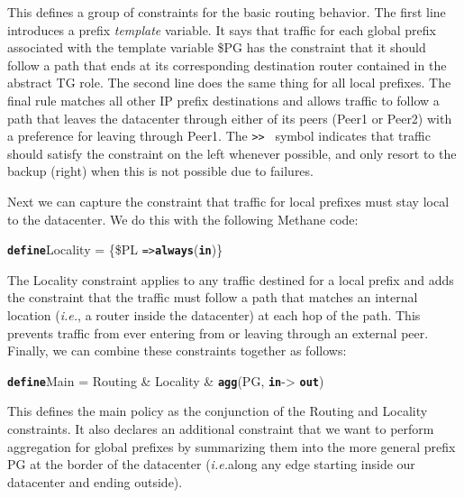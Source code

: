 \documentclass{sig-alternate-10pt}
\newcommand{\IE}{\emph{i.e.}}
\newcommand{\sysname}{{\small \sf Methane}\xspace}
\newcommand{\CD}[1]{\texttt{\small #1}}  %
\newcommand{\KW}[1]{\texttt{\small\bfseries{#1}}}
\newcommand{\True}{\CD{true}}
\newcommand{\Define}{\KW{define}}
\newcommand{\Prefer}{\texttt{>>}}
\newcommand{\Path}{\texttt{=>}}
\newcommand{\Agg}{\KW{agg}}
\newcommand{\In}{\KW{in}}
\newcommand{\Out}{\KW{out}}
\newcommand{\Always}{\KW{always}}
\newcommand{\Novalley}{\KW{novalley}}
\begin{document}
This defines a group of constraints for the basic routing behavior.
%
The first line introduces a prefix \emph{template} variable. It says that traffic for each
global prefix associated with the template variable \$PG has the constraint that it should follow
a path that ends at its corresponding destination router contained in the abstract TG role.
The second line does the same thing for all local prefixes.
The final rule matches all other
IP prefix destinations and allows traffic to follow a path that leaves the datacenter through either
of its peers (Peer1 or Peer2) with a preference for leaving through Peer1. The \Prefer~ symbol indicates
that traffic should satisfy the constraint on the left whenever possible, and only resort to the backup (right)
when this is not possible due to failures.%

Next we can capture the constraint that traffic for local prefixes must stay local to the datacenter.
We do this with the following \sysname code:
%
\begin{code}
\Define Locality = \{\$PL \Path \Always(\In)\}
\end{code}
\noindent%
%
The Locality constraint applies to any traffic destined for a local prefix and adds
the constraint that the traffic must follow a path that matches an internal location
(\IE, a router inside the datacenter) at each hop of the path. This prevents traffic
from ever entering from or leaving through an external peer. Finally, we can combine
these constraints together as follows:

%
%
%
%
%
\begin{code}
\Define Main = Routing & Locality & \Agg(PG, \In -> \Out)
\end{code}
\noindent%

This defines the main policy as the conjunction of the Routing and Locality constraints. It
also declares an additional constraint that we want to perform aggregation for global prefixes
by summarizing them into the more general prefix PG at the border of the datacenter
(\IE along any edge starting inside our datacenter and ending outside).
\end{document}
